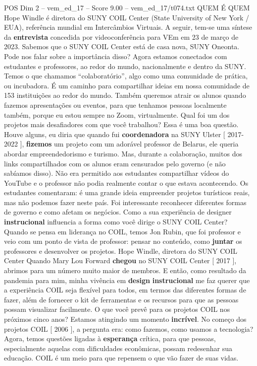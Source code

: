 \begin{textsample}{POS Dim 2 – vem\_ed\_17 – Score 9.00 – vem\_ed\_17/t074.txt}  \label{ex:f2_pos_123}
QUEM É QUEM Hope Windle é diretora do SUNY COIL Center (State University of New York / EUA), referência mundial em Intercâmbios Virtuais.
A seguir, tem-se uma síntese da \textbf{entrevista} concedida por videoconferência para VEm em 23 de março de 2023.
Sabemos que o SUNY COIL Center está de casa nova, SUNY Oneonta.
Pode nos falar sobre a importância disso?
Agora estamos conectados com estudantes e professores, ao redor do mundo, nacionalmente e dentro da SUNY.
Temos o que chamamos “colaboratório”, algo como uma comunidade de prática, ou incubadora.
É um caminho para compartilhar ideias em nossa comunidade de 153 instituições ao redor do mundo.
Também queremos atrair os alunos quando fazemos apresentações ou eventos, para que tenhamos pessoas localmente também, porque eu estou sempre no Zoom, virtualmente.
Qual foi um dos projetos mais desafiadores com que você trabalhou?
Essa é uma boa questão.
Houve alguns, eu diria que quando fui \textbf{coordenadora} na SUNY Ulster [ 2017-2022 ], \textbf{fizemos} um projeto com um adorável professor de Belarus, ele queria abordar empreendedorismo e turismo.
Mas, durante a colaboração, muitos dos links compartilhados com os alunos eram censurados pelo governo (e não sabíamos disso).
Não era permitido aos estudantes compartilhar vídeos do YouTube e o professor não podia realmente contar o que estava acontecendo.
Os estudantes comentaram: é uma grande ideia empreender projetos turísticos reais, mas não podemos fazer neste país.
Foi interessante reconhecer diferentes formas de governo e como afetam os negócios.
Como a sua experiência de designer \textbf{instrucional} influencia a forma como você dirige o SUNY COIL Center?
Quando se pensa em liderança no COIL, temos Jon Rubin, que foi professor e veio com um ponto de vista de professor: pensar no conteúdo, como \textbf{juntar} os professores e desenvolver os projetos.
Hope Windle, diretora do SUNY COIL Center Quando Mary Lou Forward \textbf{chegou} no SUNY COIL Center [ 2017 ], abrimos para um número muito maior de membros.
E então, como resultado da pandemia para mim, minha vivência em \textbf{design} \textbf{instrucional} me faz querer que a experiência COIL seja flexível para todos, em termos das diferentes formas de fazer, além de fornecer o kit de ferramentas e os recursos para que as pessoas possam visualizar facilmente.
O que você prevê para os projetos COIL nos próximos cinco anos?
Estamos atingindo um momento \textbf{incrível}.
No começo dos projetos COIL [ 2006 ], a pergunta era: como fazemos, como usamos a tecnologia?
Agora, temos questões ligadas à \textbf{esperança} crítica, para que pessoas, especialmente aquelas com dificuldades econômicas, possam redesenhar sua educação.
COIL é um meio para que repensem o que vão fazer de suas vidas.

\end{textsample}
